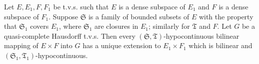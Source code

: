 Let $E, E_1, F, F_1$ be t.v.s. such that $E$ is a dense subspace of $E_1$ and $F$ is a dense subspace of $F_1$. Suppose $\mathfrak{S}$ is a family of bounded subsets of $E$ with the property that $\mathfrak{S}_1$ covers $E_1$, where $\mathfrak{S}_1$ are closures in $E_1$; similarly for $\mathfrak{T}$ and $F$. Let $G$ be a quasi-complete Hausdorff t.v.s. Then every $(\mathfrak{S}, \mathfrak{T})$-hypocontinuous bilinear mapping of $E \times F$ into $G$ has a unique extension to $E_1 \times F_1$ which is bilinear and $(\mathfrak{S}_1, \mathfrak{T}_1)$-hypocontinuous.
